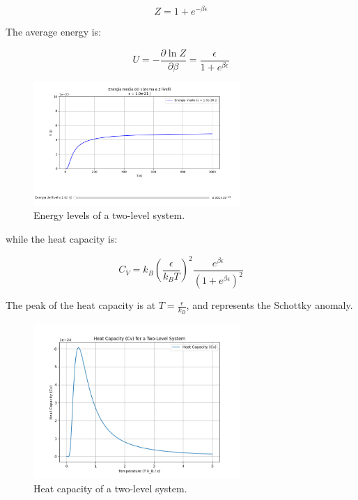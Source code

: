 \documentclass{article}
\begin{document}
\begin{equation}
    Z=1+e^{-\beta\epsilon}
\end{equation}

The average energy is:

\begin{equation}
    U=-\frac{\partial\ln{Z}}{\partial\beta}= \frac{\epsilon}{1+e^{\beta\epsilon}}
\end{equation}

\begin{figure}[h]
    \centering
    \includegraphics[width=0.7\textwidth]{images/canonical-two-levels.png}
    \caption{Energy levels of a two-level system.}
    \label{fig:two-levels-system}
\end{figure}


while the heat capacity is:

\begin{equation}
    C_V=k_B\left(\frac{\epsilon}{k_BT}\right)^2\frac{e^{\beta\epsilon}}{(1+e^{\beta\epsilon})^2}
\end{equation}

The peak of the heat capacity is at $T=\frac{\epsilon}{k_B}$, and represents the Schottky anomaly.

\begin{figure}[h!]
    \centering
    \includegraphics[width=0.7\textwidth]{images/canonical-2-levels-cv.png}
    \caption{Heat capacity of a two-level system.}
    \label{fig:heat-capacity}
\end{figure}
\end{document}
